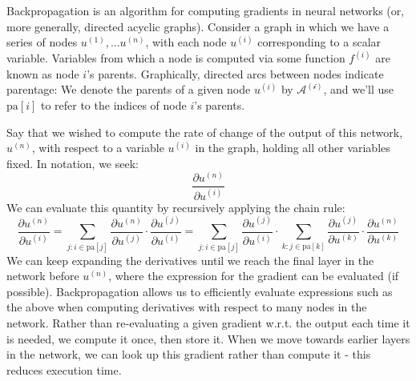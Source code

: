 \documentclass[idxtotoc,hyperref,openany]{labbook} %
\begin{document}
 Backpropagation is an algorithm for computing gradients in neural networks (or, more generally, directed acyclic graphs). Consider a graph in which we have a series of nodes $u^{(1)}, ... u^{(n)}$, with each node $u^{(i)}$ corresponding to a scalar variable. Variables from which a node is computed via some function $f^{(i)}$ are known as node $i$'s parents. Graphically, directed arcs between nodes indicate parentage: We denote the parents of a given node $u^{(i)}$ by $\mathcal{A^{(i)}}$, and we'll use  $\text{pa}[i]$ to refer to the indices of node $i$'s parents.
 
 Say that we wished to compute the rate of change of the output of this network, $u^{(n)}$, with respect to a variable $u^{(i)}$ in the graph, holding all other variables fixed. In notation, we seek:
 \[
 	\frac{\partial u^{(n)}}{\partial u^{(i)}}
 \]
 We can evaluate this quantity by recursively applying the chain rule:
 \[
 	\frac{\partial u^{(n)}}{\partial u^{(i)}}
 	 = \sum_{j: i \in \text{pa}[j]} \frac{\partial u^{(n)}}{\partial u^{(j)}}\cdot \frac{\partial u^{(j)}}{\partial u^{(i)}}
 	 =  \sum_{j: i \in \text{pa}[j]}  \frac{\partial u^{(j)}}{\partial u^{(i)}} \cdot
 	  \sum_{k: j \in \text{pa}[k]} \frac{\partial u^{(j)}}{\partial u^{(k)}} \cdot \frac{\partial u^{(n)}}{\partial u^{(k)}}
 \]
We can keep expanding the derivatives until we reach the final layer in the network before $u^{(n)}$, where the expression for the gradient can be evaluated (if possible). Backpropagation allows us to efficiently evaluate expressions such as the above when computing derivatives with respect to many nodes in the network. Rather than re-evaluating a given gradient w.r.t. the output each time it is needed, we compute it once, then store it. When we move towards earlier layers in the network, we can look up this gradient rather than compute it - this reduces execution time.
\end{document}
